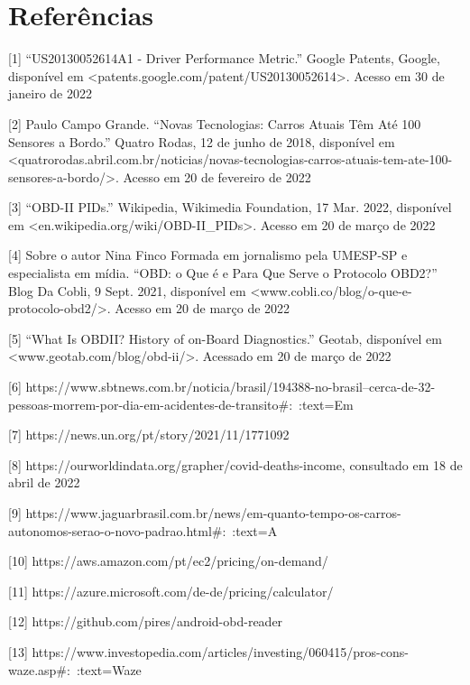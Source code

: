 \chapter{Referências}

[1] “US20130052614A1 - Driver Performance Metric.” Google Patents, Google, disponível em <patents.google.com/patent/US20130052614>. Acesso em 30 de janeiro de 2022

[2] Paulo Campo Grande. “Novas Tecnologias: Carros Atuais Têm Até 100 Sensores a Bordo.” Quatro Rodas, 12 de junho de 2018, disponível em <quatrorodas.abril.com.br/noticias/novas-tecnologias-carros-atuais-tem-ate-100-sensores-a-bordo/>. Acesso em 20 de fevereiro de 2022

[3] “OBD-II PIDs.” Wikipedia, Wikimedia Foundation, 17 Mar. 2022, disponível em <en.wikipedia.org/wiki/OBD-II_PIDs>. Acesso em 20 de março de 2022

[4] Sobre o autor Nina Finco Formada em jornalismo pela UMESP-SP e especialista em mídia. “OBD: o Que é e Para Que Serve o Protocolo OBD2?” Blog Da Cobli, 9 Sept. 2021, disponível em <www.cobli.co/blog/o-que-e-protocolo-obd2/>. Acesso em 20 de março de 2022

[5] “What Is OBDII? History of on-Board Diagnostics.” Geotab, disponível em <www.geotab.com/blog/obd-ii/>. Acessado em 20 de março de 2022

[6] https://www.sbtnews.com.br/noticia/brasil/194388-no-brasil--cerca-de-32-pessoas-morrem-por-dia-em-acidentes-de-transito#:~:text=Em%

[7] https://news.un.org/pt/story/2021/11/1771092

[8] https://ourworldindata.org/grapher/covid-deaths-income, consultado em 18 de abril de 2022

[9] https://www.jaguarbrasil.com.br/news/em-quanto-tempo-os-carros-autonomos-serao-o-novo-padrao.html#:~:text=A%

[10] https://aws.amazon.com/pt/ec2/pricing/on-demand/

[11] https://azure.microsoft.com/de-de/pricing/calculator/

[12] https://github.com/pires/android-obd-reader

[13] https://www.investopedia.com/articles/investing/060415/pros-cons-waze.asp#:~:text=Waze%
